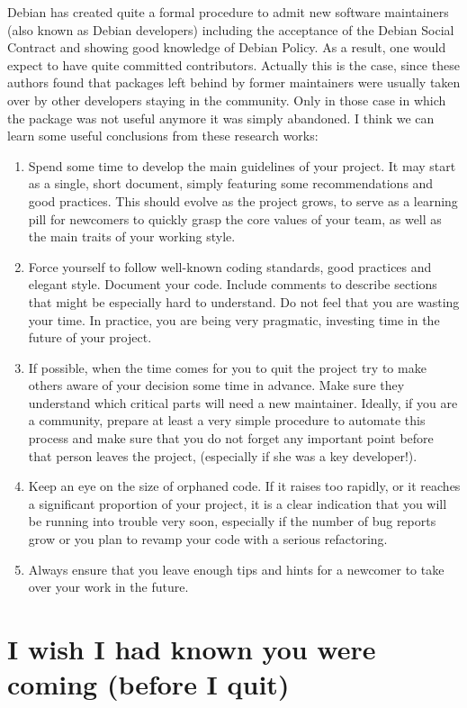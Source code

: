 Debian has created quite a formal procedure to admit new software maintainers
(also known as Debian developers) including the acceptance of the Debian Social
Contract and showing good knowledge of Debian Policy. As a result, one would
expect to have quite committed contributors. Actually this is the case, since
these authors found that packages left behind by former maintainers were usually
taken over by other developers staying in the community. Only in those case in
which the package was not useful anymore it was simply abandoned.
I think we can learn some useful conclusions from these research works:
\begin{enumerate}
 \item Spend some time to develop the main guidelines of your project. It may
start as a single, short document, simply featuring some recommendations and
good practices. This should evolve as the project grows, to serve as a learning
pill for newcomers to quickly grasp the core values of your team, as well as the
main traits of your working style.
 \item Force yourself to follow well-known coding standards, good practices and
elegant style. Document your code. Include comments to describe sections that
might be especially hard to understand. Do not feel that you are wasting your
time. In practice, you are being very pragmatic, investing time in the future of
your project.
 \item If possible, when the time comes for you to quit the project try to make
others aware of your decision some time in advance. Make sure they understand
which critical parts will need a new maintainer. Ideally, if you are a
community, prepare at least a very simple procedure to automate this process and
make sure that you do not forget any important point before that person leaves
the project, (especially if she was a key developer!).
 \item Keep an eye on the size of orphaned code. If it raises too rapidly, or it
reaches a significant proportion of your project, it is a clear indication that
you will be running into trouble very soon, especially if the number of bug
reports grow or you plan to revamp your code with a serious refactoring.
 \item Always ensure that you leave enough tips and hints for a newcomer to take
over your work in the future.
\end{enumerate}

\section*{I wish I had known you were coming (before I quit)}

